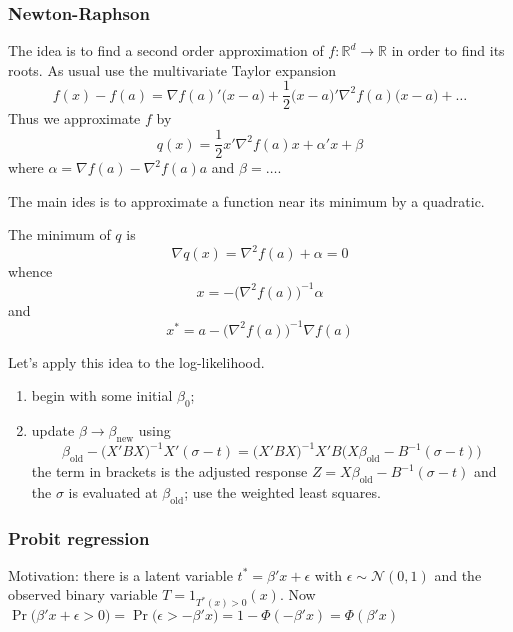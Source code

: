 \documentclass[a4paper]{article}
\newcommand{\Real}{\mathbb{R}}
\newcommand{\Ncal}{\mathcal{N}}
\begin{document}
\subsubsection{Newton-Raphson} %
\label{ssub:newton_raphson}

The idea is to find a second order approximation of $f:\Real^d\to \Real$ in order to find its roots. As usual use the multivariate Taylor expansion
\[f(x)-f(a)  = \nabla f(a)' \big(x-a\big) + \frac{1}{2}\big(x-a\big)'\nabla^2 f(a) \big(x-a\big) + \ldots \]
Thus we approximate $f$ by 
\[q(x) = \frac{1}{2}x'\nabla^2 f(a) x + \alpha' x + \beta\]
where $\alpha = \nabla f(a) - \nabla^2 f(a)a$ and $\beta = \ldots$.

The main ides is to approximate a function near its minimum by a quadratic.

The minimum of $q$ is
\[\nabla q(x) = \nabla^2 f(a) + \alpha = 0\]
whence 
\[ x = -\big(\nabla^2 f(a)\big)^{-1} \alpha \]
and 
\[ x^* = a - \big(\nabla^2 f(a)\big)^{-1} \nabla f(a) \]

Let's apply this idea to the log-likelihood.
\begin{enumerate}
	\item begin with some initial $\beta_0$;
	\item update $\beta\to \beta_{\text{new}}$ using
	\[\beta_{\text{old}} - \big(X'BX\big)^{-1} X'(\sigma - t) = \big(X'BX\big)^{-1} X'B \big( X \beta_{\text{old}} - B^{-1} (\sigma- t ) \big)\]
	the term in brackets is the adjusted response $Z = X \beta_{\text{old}} - B^{-1} (\sigma - t )$ and the $\sigma$ is evaluated at $\beta_{\text{old}}$;
	use the weighted least squares.
\end{enumerate}



\subsubsection{Probit regression} %
\label{ssub:probit_regression}

Motivation: there is a latent variable $t^* = \beta'x + \epsilon$ with $\epsilon\sim \Ncal(0,1)$ and the observed binary variable $T = 1_{T^*(x)>0}(x)$.
Now $\Pr\big(\beta'x+\epsilon > 0\big) = \Pr\big(\epsilon > -\beta'x\big) = 1-\Phi(-\beta'x) = \Phi(\beta'x)$




\end{document}
